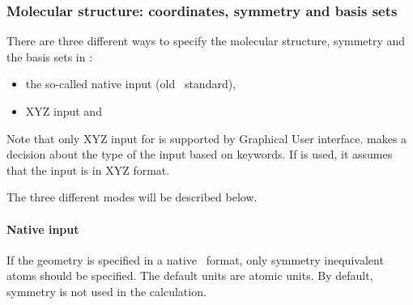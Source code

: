 \begin{keywordlist}
\end{keywordlist}


\subsubsection{Molecular structure: coordinates, symmetry and basis sets}
There are three different ways to specify the molecular structure, symmetry and
the basis sets in :
\begin{itemize}
\item
the so-called native input (old \molcas\ standard),
\item
XYZ input and
\end{itemize}
Note that only XYZ input for  is supported by Graphical User interface.
 makes a decision about the type of the input based on keywords.
If  is used, it assumes that the input is in XYZ format.

The three different modes will be described below.

\paragraph{Native input}
If the geometry is specified in a native \molcas\ format, only symmetry
inequivalent atoms should be specified. The default units are atomic units.
By default, symmetry is not used in the calculation.

